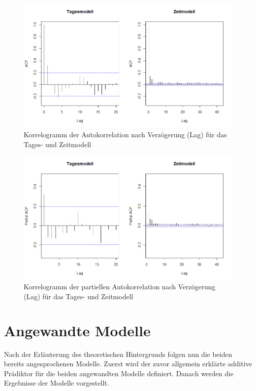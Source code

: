 \documentclass[12pt]{scrreprt}
\begin{document}
\begin{figure}[H]
	\centering
	\includegraphics[width=\linewidth]{plots/ACF}
	\caption{Korrelogramm der Autokorrelation nach Verzögerung (Lag) für das Tages- und Zeitmodell}
	\label{pic:ACF}	
\end{figure}

\begin{figure}[H]
	\centering
	\includegraphics[width=\linewidth]{plots/PACF}
	\caption{Korrelogramm der partiellen Autokorrelation nach Verzögerung (Lag) für das Tages- und Zeitmodell}
	\label{pic:PACF}	
\end{figure}


\chapter{Angewandte Modelle}
Nach der Erläuterung des theoretischen Hintergrunds folgen nun die beiden bereits angesprochenen Modelle. Zuerst wird der zuvor allgemein erklärte additive Prädiktor für die beiden angewandten Modelle definiert. Danach werden die Ergebnisse der Modelle vorgestellt.
\end{document}
